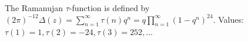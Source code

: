 The Ramanujan $\tau$-function is defined by $(2\pi)^{-12}\Delta(z) = \sum_{n=1}^{\infty} \tau(n) q^n = q\prod_{n=1}^{\infty}(1-q^n)^{24}$. Values: $\tau(1)=1, \tau(2)=-24, \tau(3)=252, \ldots$
